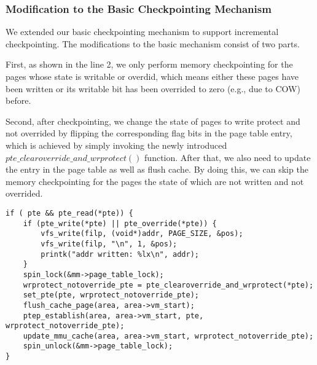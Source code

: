 \documentclass[11pt]{article}
\begin{document}
\subsubsection{Modification to the Basic Checkpointing Mechanism}

We extended our basic checkpointing mechanism to support incremental checkpointing. The modifications to the basic mechanism consist of two parts. 

First, as shown in the line 2, we only perform memory checkpointing for the pages whose state is writable or overdid, which means either these pages have been written or its writable bit has been overrided to zero (e.g., due to COW) before. 

Second, after checkpointing, we change the state of pages to write protect and not overrided by flipping the corresponding flag bits in the page table entry, which is achieved by simply invoking the newly introduced $pte\_clearoverride\_and\_wrprotect()$ function. After that, we also need to update the entry in the page table as well as flush cache. By doing this, we can skip the memory checkpointing for the pages the state of which are not written and not overrided. 

\begin{lstlisting}[style=CStyle]
if ( pte && pte_read(*pte)) {
    if (pte_write(*pte) || pte_override(*pte)) {
        vfs_write(filp, (void*)addr, PAGE_SIZE, &pos);
        vfs_write(filp, "\n", 1, &pos);
        printk("addr written: %lx\n", addr);
    }
    spin_lock(&mm->page_table_lock);
    wrprotect_notoverride_pte = pte_clearoverride_and_wrprotect(*pte);
    set_pte(pte, wrprotect_notoverride_pte);
    flush_cache_page(area, area->vm_start);
    ptep_establish(area, area->vm_start, pte, wrprotect_notoverride_pte);
    update_mmu_cache(area, area->vm_start, wrprotect_notoverride_pte);
    spin_unlock(&mm->page_table_lock);
}

\end{lstlisting}


\end{document}
